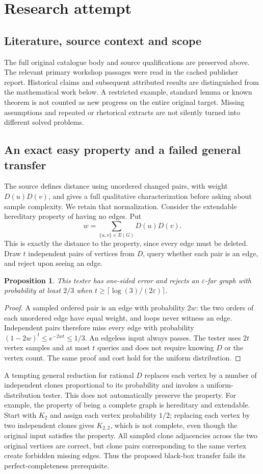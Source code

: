 \documentclass[11pt]{article}
\newtheorem{proposition}{Proposition}
\begin{document}
\section{Research attempt}
\subsection{Literature, source context and scope}
The full original catalogue body and source qualifications are preserved above. The relevant primary workshop passages were read in the cached publisher report. Historical claims and subsequent attributed results are distinguished from the mathematical work below. A restricted example, standard lemma or known theorem is not counted as new progress on the entire original target. Missing assumptions and repeated or rhetorical extracts are not silently turned into different solved problems.

\subsection{An exact easy property and a failed general transfer}
The source defines distance using unordered changed pairs, with weight $D(u)D(v)$, and gives a full qualitative characterization before asking about sample complexity. We retain that normalization. Consider the extendable hereditary property of having no edges. Put
\[
w=\sum_{\{u,v\}\in E(G)}D(u)D(v).
\]
This is exactly the distance to the property, since every edge must be deleted. Draw $t$ independent pairs of vertices from $D$, query whether each pair is an edge, and reject upon seeing an edge.
\begin{proposition}
This tester has one-sided error and rejects an $\varepsilon$-far graph with probability at least $2/3$ when $t\ge\lceil\log(3)/(2\varepsilon)\rceil$.
\end{proposition}
\begin{proof}
A sampled ordered pair is an edge with probability $2w$: the two orders of each unordered edge have equal weight, and loops never witness an edge. Independent pairs therefore miss every edge with probability $(1-2w)^t\le e^{-2wt}\le1/3$. An edgeless input always passes. The tester uses $2t$ vertex samples and at most $t$ queries and does not require knowing $D$ or the vertex count. The same proof and cost hold for the uniform distribution.
\end{proof}
A tempting general reduction for rational $D$ replaces each vertex by a number of independent clones proportional to its probability and invokes a uniform-distribution tester. This does not automatically preserve the property. For example, the property of being a complete graph is hereditary and extendable. Start with $K_2$ and assign each vertex probability $1/2$; replacing each vertex by two independent clones gives $K_{2,2}$, which is not complete, even though the original input satisfies the property. All sampled clone adjacencies across the two original vertices are correct, but clone pairs corresponding to the same vertex create forbidden missing edges. Thus the proposed black-box transfer fails its perfect-completeness prerequisite.
\end{document}
